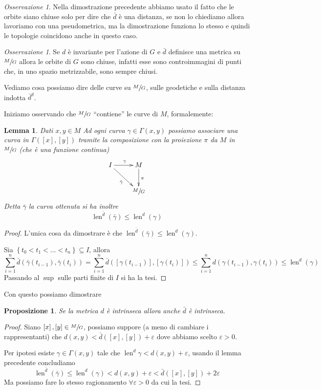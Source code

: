 \documentclass[a4paper,10pt]{article}
\newcounter{counter1}
\theoremstyle{plain}
\newtheorem{mylem}[counter1]{Lemma}
\newtheorem{mypro}[counter1]{Proposizione}
\theoremstyle{definition}
\theoremstyle{remark}
\newtheorem{myoss}[counter1]{Osservazione}
\newcommand{\set}[1]{\left\{#1\right\}}
\newcommand{\pa}[1]{\left(#1\right)}
\newcommand{\bra}[1]{\left[#1\right]}
\DeclareMathOperator{\len}{len}
\begin{document}
\begin{myoss}
  Nella dimostrazione precedente abbiamo usato il fatto che le orbite
  siano chiuse solo per dire che $\bar d$ è una distanza, se non lo
  chiediamo allora lavoriamo con una pseudometrica, ma la
  dimostrazione funziona lo stesso e quindi le topologie coincidono
  anche in questo caso.
\end{myoss}

\begin{myoss}
  Se $d$ è invariante per l'azione di $G$ e $\bar d$ definisce una
  metrica su $\sfrac{M}{G}$ allora le orbite di $G$ sono chiuse,
  infatti esse sono controimmagini di punti che, in uno spazio
  metrizzabile, sono sempre chiusi.
\end{myoss}

Vediamo cosa possiamo dire delle curve su $\sfrac{M}{G}$, sulle
geodetiche e sulla distanza indotta $\bar d ^g$.

Iniziamo osservando che $\sfrac{M}{G}$ ``contiene'' le curve di $M$,
formalemente:
\begin{mylem}
  Dati $x,y \in M$ Ad ogni curva $\gamma \in \Gamma(x,y)$ possiamo
  associare una curva in $\Gamma(\bra{x}, \bra{y})$ tramite la
  composizione con la proiezione $\pi$ da $M$ in $\sfrac{M}{G}$ (che è
  una funzione continua)
  \[ 
     \xymatrix{I \ar[r]^\gamma \ar[dr] _{\bar \gamma}& M \ar[d]^\pi \\
              & \sfrac{M}{G}  
            }
            \]
  Detta $\bar \gamma$ la curva ottenuta si ha inoltre
  \[ \len ^{\bar d} \pa{ \bar \gamma} \le \len ^d \pa{\gamma } \]
\end{mylem}
\begin{proof}
  L'unica cosa da dimostrare è che $\len ^{\bar d} \pa{ \bar \gamma}
  \le \len ^d \pa{\gamma }$.
  
  Sia $\set{ t_0 < t_1 < ... < t_n } \subseteq I$, allora
  \[ \sum _{i = 1} ^n \bar d ( \bar \gamma ( t_{i-1}) , \bar \gamma
  (t_i) ) = \sum _{i = 1} ^n \bar d ( \bra{\gamma ( t_{i-1}) } , \bra{
    \gamma (t_i)} ) \le \sum _{i = 1} ^n d ( \gamma ( t_{i-1}) ,
  \gamma (t_i) )  \le \len ^d (\gamma) \]
  Passando al $\sup$ sulle parti finite di $I$ si ha la tesi.
\end{proof}

Con questo possiamo dimostrare
\begin{mypro}
  Se la metrica $d$ è intrinseca allora anche $\bar d$ è intrinseca.
\end{mypro}
\begin{proof}
  Siano $\bra{x}, \bra{y} \in \sfrac{M}{G}$, possiamo suppore (a meno
  di cambiare i rappresentanti) che $d(x,y) < \bar d (\bra{x}, \bra{y}
  ) + \varepsilon$ dove abbiamo scelto $\varepsilon > 0$.

  Per ipotesi esiste $\gamma \in \Gamma( x,y)$ tale che $\len ^d
  \gamma < d(x,y) + \varepsilon$, usando il lemma precedente
  concludiamo
  \[ \len ^{\bar d} (\bar \gamma) \le \len ^d (\gamma) < d(x,y) +
  \varepsilon < \bar d (\bra{x}, \bra{y}) + 2\varepsilon \]
  Ma possiamo fare lo stesso ragionamento $\forall \varepsilon >0$ da
  cui la tesi.
\end{proof}
\end{document}
